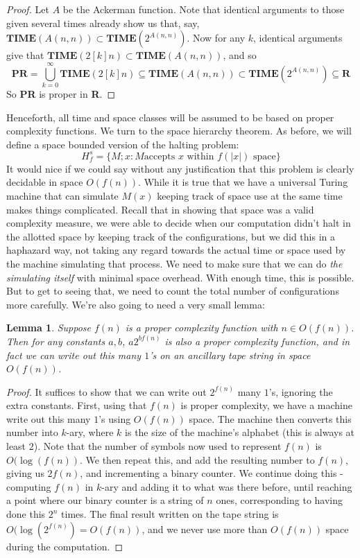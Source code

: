 \documentclass{article}
\theoremstyle{definition}
\theoremstyle{plain}
\theoremstyle{theorem}
\newtheorem{lemma}{Lemma}[section]
\begin{document}
\begin{proof}
	Let $A$ be the Ackerman function. Note that identical arguments to those given several times already show us that, say, $\textbf{TIME}(A(n,n)) \subset \textbf{TIME}(2^{A(n,n)})$. Now for any $k$, identical arguments give that $\textbf{TIME}(2[k]n) \subset \textbf{TIME}(A(n,n))$, and so
	\[\textbf{PR} = \bigcup_{k=0}^{\infty} \textbf{TIME}(2[k]n) \subseteq \textbf{TIME}(A(n,n)) \subset \textbf{TIME}(2^{A(n,n)}) \subseteq \textbf{R} \]
So \textbf{PR} is proper in \textbf{R}.
\end{proof}
Henceforth, all time and space classes will be assumed to be based on proper complexity functions. We turn to the space hierarchy theorem. As before, we will define a space bounded version of the halting problem: 
	\[ H^s_f = \{M;x : M \textrm{accepts $x$ within $f(|x|)$ space} \} \]
It would nice if we could say without any justification that this problem is clearly decidable in space $O(f(n))$. While it is true that we have a universal Turing machine that can simulate $M(x)$ keeping track of space use at the same time makes things complicated. Recall that in showing that space was a valid complexity measure, we were able to decide when our computation didn't halt in the allotted space by keeping track of the configurations, but we did this in a haphazard way, not taking any regard towards the actual time or space used by the machine simulating that process. We need to make sure that we can do \textit{the simulating itself} with minimal space overhead. With enough time, this is possible. But to get to seeing that, we need to count the total number of configurations more carefully. We're also going to need a very small lemma:
\begin{lemma}
	Suppose $f(n)$ is a proper complexity function with $n \in O(f(n))$. Then for any constants $a,b$, $a2^{bf(n)}$ is also a proper complexity function, and in fact we can write out this many $1$'s on an ancillary tape string in space $O(f(n))$.
\end{lemma}
\begin{proof}
	It suffices to show that we can write out $2^{f(n)}$ many $1$'s, ignoring the extra constants. First, using that $f(n)$ is proper complexity, we have a machine write out this many $1$'s using $O(f(n))$ space. The machine then converts this number into $k$-ary, where $k$ is the size of the machine's alphabet (this is always at least $2$). Note that the number of symbols now used to represent $f(n)$ is $O(\log(f(n))$. We then repeat this, and add the resulting number to $f(n)$, giving us $2f(n)$, and incrementing a binary counter. We continue doing this - computing $f(n)$ in $k$-ary and adding it to what was there before, until reaching a point where our binary counter is a string of $n$ ones, corresponding to having done this $2^n$ times. The final result written on the tape string is $O(\log(2^{f(n)}) = O(f(n))$, and we never use more than $O(f(n))$ space during the computation. 
\end{proof}
\end{document}
